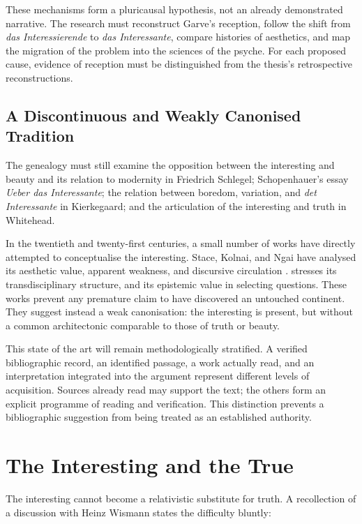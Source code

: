 \documentclass[11pt,a4paper]{article}
\begin{document}
These mechanisms form a pluricausal hypothesis, not an already demonstrated
narrative. The research must reconstruct Garve's reception, follow the shift
from \emph{das Interessierende} to \emph{das Interessante}, compare histories of
aesthetics, and map the migration of the problem into the sciences of the
psyche. For each proposed cause, evidence of reception must be distinguished
from the thesis's retrospective reconstructions.

\subsection{A Discontinuous and Weakly Canonised Tradition}

The genealogy must still examine the opposition between the interesting and
beauty and its relation to modernity in Friedrich Schlegel; Schopenhauer's essay
\emph{Ueber das Interessante}; the relation between boredom, variation, and
\emph{det Interessante} in Kierkegaard; and the articulation of the interesting
and truth in Whitehead.

In the twentieth and twenty-first centuries, a small number of works have
directly attempted to conceptualise the interesting. Stace, Kolnai, and Ngai
have analysed its aesthetic value, apparent weakness, and discursive circulation
\parencite{stace1944interestingness,kolnai1964concept,ngai2008merely,ngai2012categories}.
\textcite{epstein2009interesting} stresses its transdisciplinary structure, and
\textcite{grimm2011interesting} its epistemic value in selecting questions.
These works prevent any premature claim to have discovered an untouched
continent. They suggest instead a weak canonisation: the interesting is present,
but without a common architectonic comparable to those of truth or beauty.

This state of the art will remain methodologically stratified. A verified
bibliographic record, an identified passage, a work actually read, and an
interpretation integrated into the argument represent different levels of
acquisition. Sources already read may support the text; the others form an
explicit programme of reading and verification. This distinction prevents a
bibliographic suggestion from being treated as an established authority.

\section{The Interesting and the True}

The interesting cannot become a relativistic substitute for truth. A
recollection of a discussion with Heinz Wismann states the difficulty bluntly:
\end{document}
